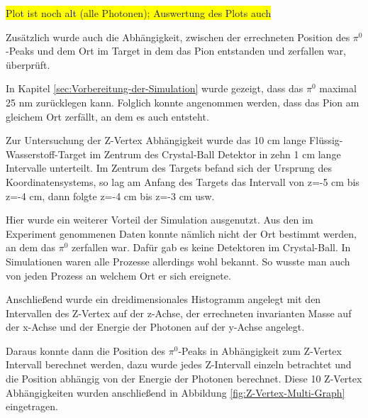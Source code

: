 \documentclass[a4paper,11pt,oneside,final,german,openbib,pdftex]{scrbook}
\begin{document}
{\colorbox{yellow}{Plot ist noch alt (alle Photonen); Auswertung des Plots auch}

Zusätzlich wurde auch die Abh\"angigkeit, zwischen der errechneten  Position des $\pi^0$-Peaks und dem Ort im Target in dem das Pion entstanden und zerfallen war, \"uberpr\"uft. 

In Kapitel \ref{sec:Vorbereitung-der-Simulation} wurde gezeigt, dass das $\pi^0$ maximal 25 nm zurücklegen kann. Folglich konnte angenommen werden, dass das Pion am gleichem Ort zerf\"allt, an dem es auch entsteht.

 
Zur Untersuchung der Z-Vertex Abhängigkeit wurde das 10 cm lange Fl\"ussig-Wasserstoff-Target im Zentrum des Crystal-Ball Detektor in zehn 1 cm lange Intervalle unterteilt. 
Im Zentrum des Targets befand sich der Ursprung des Koordinatensystems, so lag am Anfang des Targets das Intervall von z=-5 cm bis z=-4 cm, dann folgte z=-4 cm bis z=-3 cm usw. 

Hier wurde ein weiterer Vorteil der Simulation ausgenutzt. Aus den im Experiment genommenen Daten konnte n\"amlich nicht der Ort bestimmt werden, an dem das $\pi^0$ zerfallen war. Daf\"ur gab es keine Detektoren im Crystal-Ball. In Simulationen waren alle Prozesse allerdings wohl bekannt. So wusste man auch von jeden Prozess an welchem Ort er sich ereignete. 

 Anschließend wurde ein dreidimensionales Histogramm angelegt mit den Intervallen des Z-Vertex auf der z-Achse, der errechneten invarianten Masse auf der x-Achse und der Energie der Photonen auf der y-Achse angelegt. 

Daraus konnte dann die Position des $\pi^0$-Peaks in Abhängigkeit zum Z-Vertex Intervall berechnet werden, dazu wurde jedes Z-Intervall einzeln betrachtet und die Position abhängig von der Energie der Photonen berechnet.
Diese 10 Z-Vertex Abhängigkeiten wurden anschließend in Abbildung \ref{fig:Z-Vertex-Multi-Graph} eingetragen.

}
\end{document}
